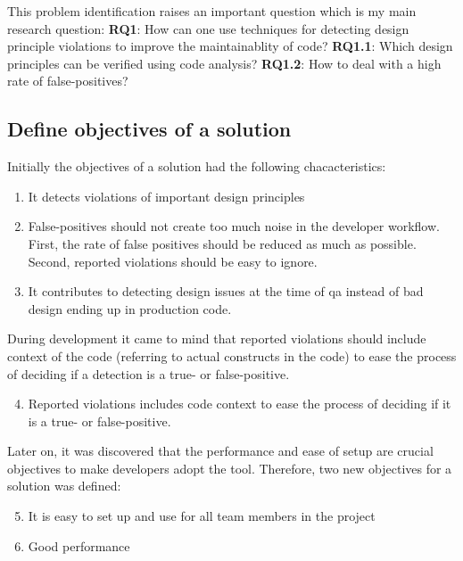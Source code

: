 \documentclass{article}
\begin{document}
\hfill \newline
This problem identification raises an important question which is my main research question:
\hfill \newline
\hfill \newline
\textbf{RQ1}: How can one use techniques for detecting design principle violations to improve the maintainablity of code? \newline
\textbf{RQ1.1}: Which design principles can be verified using code analysis? \newline
\textbf{RQ1.2}: How to deal with a high rate of false-positives? 


\subsection{Define objectives of a solution}
\label{objectives-of-solution}
Initially the objectives of a solution had the following chacacteristics:
\begin{enumerate}
    \item It detects violations of important design principles
    \item False-positives should not create too much noise in the developer workflow. First, the rate of false positives should be reduced as much as possible. Second, reported violations should be easy to ignore. 
    \item It contributes to detecting design issues at the time of \gls{qa} instead of bad design ending up in production code.
\end{enumerate}

During development it came to mind that reported violations should include context of the code (referring to actual constructs in the code) to ease the process of deciding if a detection is a true- or false-positive. 
\begin{enumerate}
  \setcounter{enumi}{3}
    \item Reported violations includes code context to ease the process of deciding if it is a true- or false-positive. 
\end{enumerate}

Later on, it was discovered that the performance and ease of setup are crucial objectives to make developers adopt the tool. Therefore, two new objectives for a solution was defined:
\begin{enumerate}
\setcounter{enumi}{4}
     \item It is easy to set up and use for all team members in the project
    \item Good performance
\end{enumerate}
\end{document}
